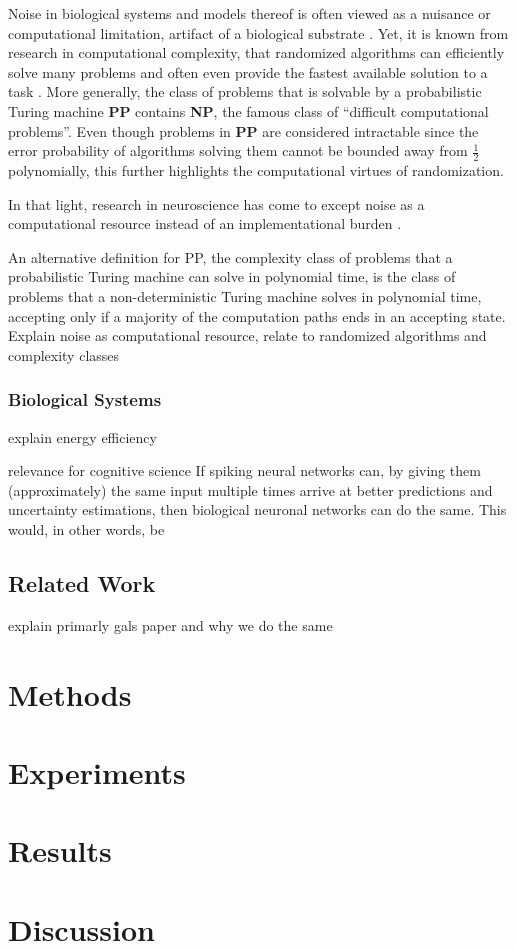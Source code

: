 \documentclass[10pt,a4paper,twocolumn]{article}
\begin{document}
Noise in biological systems and models thereof is often viewed as a nuisance or computational limitation, artifact of a biological substrate \cite{maass2014noise}. Yet, it is known from research in computational complexity, that randomized algorithms can efficiently solve many problems and often even provide the fastest available solution to a task \cite{motwani2010randomized}. More generally, the class of problems that is solvable by a probabilistic Turing machine \textbf{PP} contains \textbf{NP}, the famous class of ``difficult computational problems''. Even though problems in \textbf{PP} are considered intractable since the error probability of algorithms solving them cannot be bounded away from $\frac{1}{2}$ polynomially, this further highlights the computational virtues of randomization. 

In that light, research in neuroscience has come to except noise as a computational resource instead of an implementational burden \cite{maass2014noise}.

An alternative definition for PP, the complexity class of problems that a probabilistic Turing machine can solve in polynomial time, is the class of problems that a non-deterministic Turing machine solves in polynomial time, accepting only if a majority of the computation paths ends in an accepting state.
Explain noise as computational resource, relate to randomized algorithms and complexity classes

\subsubsection{Biological Systems}
explain energy efficiency

relevance for cognitive science
If spiking neural networks can, by giving them (approximately) the same input multiple times arrive at better predictions and uncertainty estimations, then biological neuronal networks can do the same. This would, in other words, be 

\subsection{Related Work}
explain primarly gals paper and why we do the same

\section{Methods}

\section{Experiments}

\section{Results}

\section{Discussion}


\end{document}
